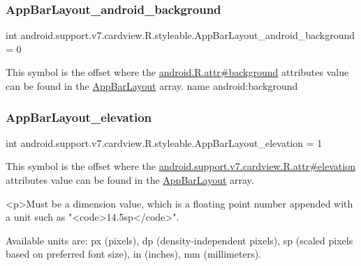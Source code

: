 \subsubsection{\texorpdfstring{App\+Bar\+Layout\+\_\+android\+\_\+background}{AppBarLayout\_android\_background}}
{\footnotesize\ttfamily int android.\+support.\+v7.\+cardview.\+R.\+styleable.\+App\+Bar\+Layout\+\_\+android\+\_\+background = 0\hspace{0.3cm}{\ttfamily [static]}}

This symbol is the offset where the \hyperlink{}{android.\+R.\+attr\#background} attribute\textquotesingle{}s value can be found in the \hyperlink{classandroid_1_1support_1_1v7_1_1cardview_1_1R_1_1styleable_ab9fe56d8bb5990d833de044115d0edbe}{App\+Bar\+Layout} array.  name android\+:background \mbox{\label{classandroid_1_1support_1_1v7_1_1cardview_1_1R_1_1styleable_a405d6ed7804434784f1f7baf4ccfe842}} 
\subsubsection{\texorpdfstring{App\+Bar\+Layout\+\_\+elevation}{AppBarLayout\_elevation}}
{\footnotesize\ttfamily int android.\+support.\+v7.\+cardview.\+R.\+styleable.\+App\+Bar\+Layout\+\_\+elevation = 1\hspace{0.3cm}{\ttfamily [static]}}

This symbol is the offset where the \hyperlink{classandroid_1_1support_1_1v7_1_1cardview_1_1R_1_1attr_af8da2ee4ea221f8d413747edbfbf8ccb}{android.\+support.\+v7.\+cardview.\+R.\+attr\#elevation} attribute\textquotesingle{}s value can be found in the \hyperlink{classandroid_1_1support_1_1v7_1_1cardview_1_1R_1_1styleable_ab9fe56d8bb5990d833de044115d0edbe}{App\+Bar\+Layout} array.

\begin{DoxyVerb}      <p>Must be a dimension value, which is a floating point number appended with a unit such as "<code>14.5sp</code>".
\end{DoxyVerb}
 Available units are\+: px (pixels), dp (density-\/independent pixels), sp (scaled pixels based on preferred font size), in (inches), mm (millimeters). 

